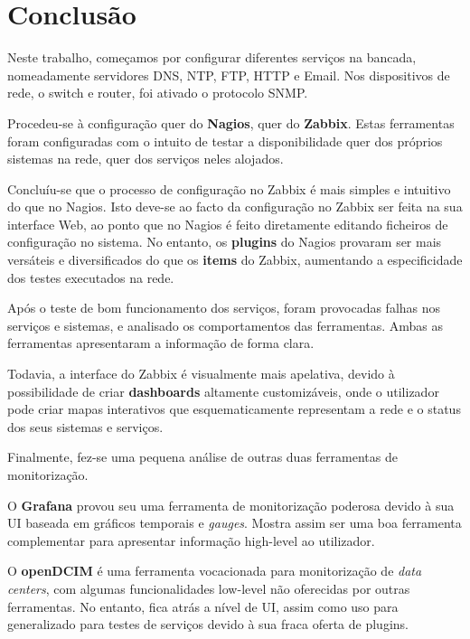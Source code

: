 \chapter{Conclusão}

Neste trabalho, começamos por configurar diferentes serviços na bancada, nomeadamente servidores DNS, NTP, FTP, HTTP e Email.
Nos dispositivos de rede, o switch e router, foi ativado o protocolo SNMP.

Procedeu-se à configuração quer do \textbf{Nagios}, quer do \textbf{Zabbix}.
Estas ferramentas foram configuradas com o intuito de testar a disponibilidade quer dos próprios sistemas na rede,
quer dos serviços neles alojados.

Concluíu-se que o processo de configuração no Zabbix é mais simples e intuitivo do que no Nagios.
Isto deve-se ao facto da configuração no Zabbix ser feita na sua interface Web, ao ponto que no Nagios é feito diretamente editando ficheiros de configuração no sistema.
No entanto, os \textbf{plugins} do Nagios provaram ser mais versáteis e diversificados do que os \textbf{items} do Zabbix, aumentando a especificidade dos testes executados na rede.

Após o teste de bom funcionamento dos serviços, foram provocadas falhas nos serviços e sistemas,
e analisado os comportamentos das ferramentas. Ambas as ferramentas apresentaram a informação de forma clara.

Todavia, a interface do Zabbix é visualmente mais apelativa, devido à possibilidade de criar \textbf{dashboards} altamente customizáveis,
onde o utilizador pode criar mapas interativos que esquematicamente representam a rede e o status dos seus sistemas e serviços.

Finalmente, fez-se uma pequena análise de outras duas ferramentas de monitorização.

O \textbf{Grafana} provou seu uma ferramenta de monitorização poderosa devido à sua UI baseada em gráficos temporais e \textit{gauges}.
Mostra assim ser uma boa ferramenta complementar para apresentar informação high-level ao utilizador.

O \textbf{openDCIM} é uma ferramenta vocacionada para monitorização de \textit{data centers}, com algumas funcionalidades low-level não oferecidas por outras ferramentas.
No entanto, fica atrás a nível de UI, assim como uso para generalizado para testes de serviços devido à sua fraca oferta de plugins.
